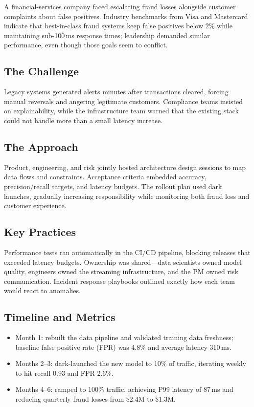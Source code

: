 A financial-services company faced escalating fraud losses alongside customer complaints about false positives. Industry benchmarks from Visa and Mastercard indicate that best-in-class fraud systems keep false positives below 2\% while maintaining sub-100\,ms response times; leadership demanded similar performance, even though those goals seem to conflict.

\subsection{The Challenge}
Legacy systems generated alerts minutes after transactions cleared, forcing manual reversals and angering legitimate customers. Compliance teams insisted on explainability, while the infrastructure team warned that the existing stack could not handle more than a small latency increase.

\subsection{The Approach}
Product, engineering, and risk jointly hosted architecture design sessions to map data flows and constraints. Acceptance criteria embedded accuracy, precision/recall targets, and latency budgets. The rollout plan used dark launches, gradually increasing responsibility while monitoring both fraud loss and customer experience.

\subsection{Key Practices}
Performance tests ran automatically in the CI/CD pipeline, blocking releases that exceeded latency budgets. Ownership was shared—data scientists owned model quality, engineers owned the streaming infrastructure, and the PM owned risk communication. Incident response playbooks outlined exactly how each team would react to anomalies.

\subsection{Timeline and Metrics}
\begin{itemize}
    \item Month 1: rebuilt the data pipeline and validated training data freshness; baseline false positive rate (FPR) was 4.8\% and average latency 310\,ms.
    \item Months 2--3: dark-launched the new model to 10\% of traffic, iterating weekly to hit recall 0.93 and FPR 2.6\%.
    \item Months 4--6: ramped to 100\% traffic, achieving P99 latency of 87\,ms and reducing quarterly fraud losses from \$2.4M to \$1.3M.
\end{itemize}

